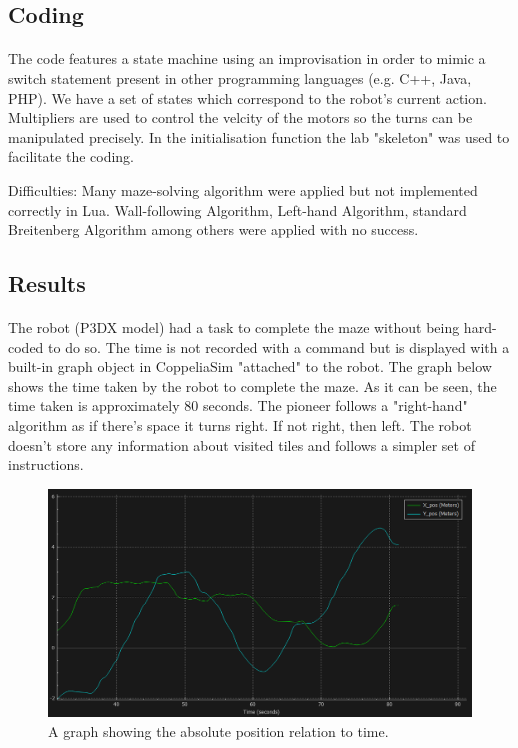 \documentclass[12pt]{report}
\begin{document}
\subsection*{Coding}
\paragraph{}

The code features a state machine using an improvisation in order to mimic a switch statement present in other programming languages (e.g. C++, Java, PHP). We have a set of states which correspond to
the robot's current action. Multipliers are used to control the velcity of the motors so the turns can be manipulated precisely. In the initialisation function the lab "skeleton" was used to 
facilitate the coding.

Difficulties: Many maze-solving algorithm were applied but not implemented correctly in Lua. Wall-following Algorithm, Left-hand Algorithm, standard Breitenberg Algorithm among
others were applied with no success.

\clearpage

\subsection*{Results}
\paragraph{}

The robot (P3DX model) had a task to complete the maze without being hard-coded to do so. The time is not recorded with a command but is displayed with a built-in graph object in CoppeliaSim "attached" to the robot.
The graph below shows the time taken by the robot to complete the maze. As it can be seen, the time taken is approximately 80 seconds.
The pioneer follows a "right-hand" algorithm as if there's space it turns right. If not right, then left. The robot doesn't store any information about visited tiles and follows a simpler set of instructions.

\begin{figure} [!h]
  \includegraphics[width=\linewidth]{graph.png}
  \caption{A graph showing the absolute position relation to time.}
  \label{fig:boat1}
\end{figure}
\end{document}
